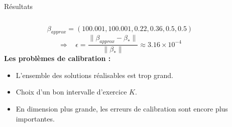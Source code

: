 \documentclass[final]{beamer}
\newlength{\sepwid}
\newlength{\onecolwid}
\newlength{\twocolwid}
\begin{document}
\begin{frame}[t]
\begin{columns}[t]
\begin{column}{\twocolwid}
\begin{block}{Résultats}
\begin{columns}[t,totalwidth=0.45\paperwidth]
\begin{column}{\onecolwid}
\vspace{-1cm}
  $$ \beta_{approx} = (100.001,100.001,0.22,0.36,0.5,0.5) $$
  $$ \Rightarrow \ \ \ \ \epsilon = \frac{\|\beta_{approx}-\beta_* \|}{\|\beta_* \|} \approx 3.16 \times 10^{-4}$$
  \textbf{Les problèmes de calibration :}
  \begin{itemize}
    \item L'ensemble des solutions réalisables est trop grand.
    \item Choix d'un bon intervalle d'exercice $K$.
    \item En dimension plus grande, les erreurs de calibration sont encore plus importantes.
  \end{itemize}

\end{column} %

\end{columns} %

\end{block}

\end{column} %

\begin{column}{\sepwid}\end{column} %


\begin{column}{\onecolwid} %



\end{column}
\end{columns}
\end{frame}
\end{document}
